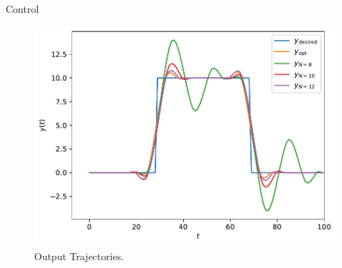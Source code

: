 \begin{chapter}{Control}
    \begin{figure}[h]
        \centering
        \includegraphics[width=\linewidth]{examples/364b/364b_mpc_output.pdf}
        \caption{Output Trajectories.}
        \label{fig:364-hw7-traj-out}
    \end{figure}
    
\end{chapter}
